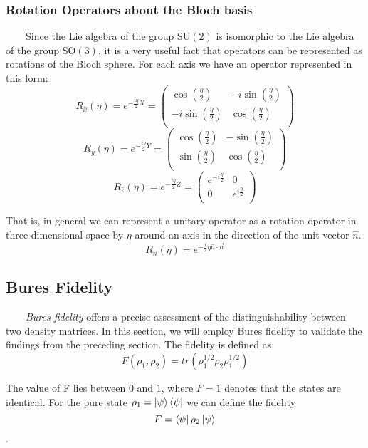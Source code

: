\documentclass[english,14pt,a4paper]{article}
\begin{document}
	\subsubsection{Rotation Operators about the Bloch basis}\ \ \ \
	Since the Lie algebra of the group $\text{SU}(2)$ is isomorphic to the Lie algebra of the group $\text{SO}(3)$, it is a very useful fact that operators can be represented as rotations of the Bloch sphere. For each axis we have an operator represented in this form:
	\[
		R_{\hat{x}}(\eta) = e^{-\frac{i\eta}{2}X} = \begin{pmatrix}
			\cos(\frac{\eta}{2}) & -i\sin(\frac{\eta}{2}) \\
			-i\sin(\frac{\eta}{2}) & \cos(\frac{\eta}{2}) \\
		\end{pmatrix}	
	\]
	\[
	R_{\hat{y}}(\eta) = e^{-\frac{i\eta}{2}Y} = \begin{pmatrix}
		\cos(\frac{\eta}{2}) & -\sin(\frac{\eta}{2}) \\
		\sin(\frac{\eta}{2}) & \cos(\frac{\eta}{2}) \\
	\end{pmatrix}	
	\]
	\[
	R_{\hat{z}}(\eta) = e^{-\frac{i\eta}{2}Z} = \begin{pmatrix}
		e^{-i\frac{\eta}{2}} & 0 \\
		0 &  e^{i\frac{\eta}{2}}\\
	\end{pmatrix}	
	\]
	
	That is, in general we can represent a unitary operator as a rotation operator in three-dimensional space by $\eta$ around an axis in the direction of the unit vector $\hat{n}$.
	 \begin{equation}
	 R_{\hat{n}}(\eta) = e^{-\frac{i}{2}\eta \hat{n}\cdot \vec{\sigma}}
	\end{equation}
	\subsection{Bures Fidelity} \ \ \ \
	\textit{Bures fidelity} offers a precise assessment of the distinguishability between two density matrices. In this section, we will employ Bures fidelity to validate the findings from the preceding section. The fidelity is defined as: 
	\begin{equation}
		F(\rho_1, \rho_2) = tr(\rho_1^{1/2}\rho_2\rho_1^{1/2})
	\end{equation}
	
	The value of F lies between $0$ and $1$, where $F = 1$ denotes that the states are identical. For the pure state $\rho_1 = \ket{\psi}\bra{\psi}$ we can define the fidelity \[F = \bra{\psi}\rho_2 \ket{\psi}\].
	
\end{document}
